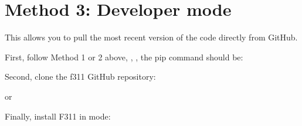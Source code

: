 \documentclass[letterpaper,10pt,english]{sphinxmanual}
\begin{document}
\begin{sphinxVerbatim}[commandchars=\\\{\}]
 
\end{sphinxVerbatim}


\section{Method 3: Developer mode}
\label{\detokenize{install:method-3-developer-mode}}
This allows you to pull the most recent version of the code directly from GitHub.

First, follow Method 1 or 2 above, , , the pip command should be:

\begin{sphinxVerbatim}[commandchars=\\\{\}]
               
\end{sphinxVerbatim}

Second, clone the f311 GitHub repository:

\begin{sphinxVerbatim}[commandchars=\\\{\}]
  
\end{sphinxVerbatim}

or

\begin{sphinxVerbatim}[commandchars=\\\{\}]
  
\end{sphinxVerbatim}

Finally, install F311 in  mode:

\begin{sphinxVerbatim}[commandchars=\\\{\}]
 
  
\end{sphinxVerbatim}
\end{document}
